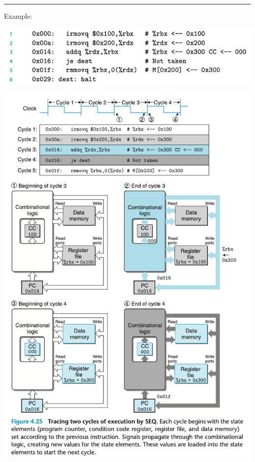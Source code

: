 \documentclass[11pt]{article}
\begin{document}
\noindent\rule{\textwidth}{0.5pt}
Example:\\

\begin{center}
\includegraphics[width=.9\linewidth]{pics/seq-hardware-example.png}
\end{center}

\begin{center}
\includegraphics[width=.9\linewidth]{pics/figure4.25-tracing-two-cycles-of-execution-by-seq.png}
\end{center}
\end{document}
